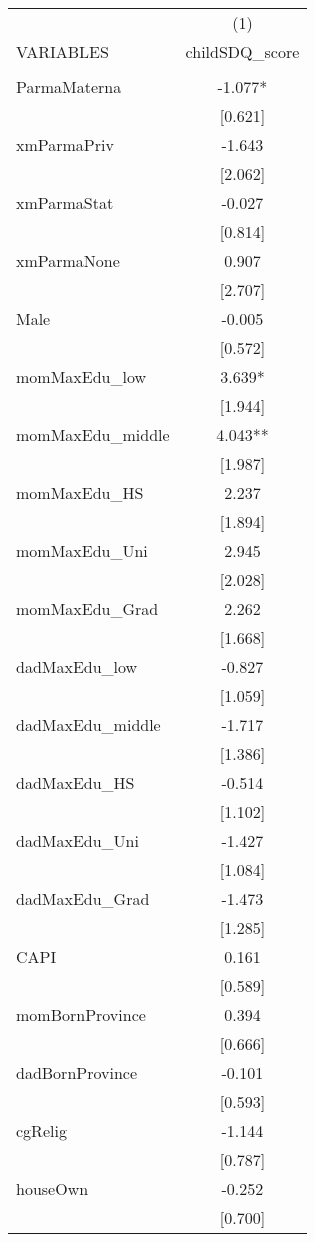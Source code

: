 \documentclass[]{article}
\begin{document}
\begin{tabular}{lc} \hline
 & (1) \\
VARIABLES & childSDQ\_score \\ \hline
 &  \\
ParmaMaterna & -1.077* \\
 & [0.621] \\
xmParmaPriv & -1.643 \\
 & [2.062] \\
xmParmaStat & -0.027 \\
 & [0.814] \\
xmParmaNone & 0.907 \\
 & [2.707] \\
Male & -0.005 \\
 & [0.572] \\
momMaxEdu\_low & 3.639* \\
 & [1.944] \\
momMaxEdu\_middle & 4.043** \\
 & [1.987] \\
momMaxEdu\_HS & 2.237 \\
 & [1.894] \\
momMaxEdu\_Uni & 2.945 \\
 & [2.028] \\
momMaxEdu\_Grad & 2.262 \\
 & [1.668] \\
dadMaxEdu\_low & -0.827 \\
 & [1.059] \\
dadMaxEdu\_middle & -1.717 \\
 & [1.386] \\
dadMaxEdu\_HS & -0.514 \\
 & [1.102] \\
dadMaxEdu\_Uni & -1.427 \\
 & [1.084] \\
dadMaxEdu\_Grad & -1.473 \\
 & [1.285] \\
CAPI & 0.161 \\
 & [0.589] \\
momBornProvince & 0.394 \\
 & [0.666] \\
dadBornProvince & -0.101 \\
 & [0.593] \\
cgRelig & -1.144 \\
 & [0.787] \\
houseOwn & -0.252 \\
 & [0.700] \\

\end{tabular}
\end{document}
